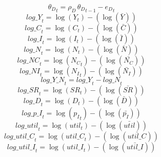 \begin{dmath}
{{\theta_D}}_{t}={{\rho_D}}\, {{\theta_D}}_{t-1}-{{e_D}}_{t}
\end{dmath}
\begin{dmath}
{log\_Y}_{t}=\log\left({{Y}}_{t}\right)-(\log\left(\bar{{Y}}\right))
\end{dmath}
\begin{dmath}
{log\_C}_{t}=\log\left({{C}}_{t}\right)-(\log\left(\bar{{C}}\right))
\end{dmath}
\begin{dmath}
{log\_I}_{t}=\log\left({{I}}_{t}\right)-(\log\left(\bar{{I}}\right))
\end{dmath}
\begin{dmath}
{log\_N}_{t}=\log\left({{N}}_{t}\right)-(\log\left(\bar{{N}}\right))
\end{dmath}
\begin{dmath}
{log\_NC}_{t}=\log\left({{N_C}}_{t}\right)-(\log\left(\bar{{N_C}}\right))
\end{dmath}
\begin{dmath}
{log\_NI}_{t}=\log\left({{N_I}}_{t}\right)-(\log\left(\bar{{N_I}}\right))
\end{dmath}
\begin{dmath}
{log\_Y\_N}_{t}={log\_Y}_{t}-{log\_N}_{t}
\end{dmath}
\begin{dmath}
{log\_SR}_{t}=\log\left({{SR}}_{t}\right)-(\log\left(\bar{{SR}}\right))
\end{dmath}
\begin{dmath}
{log\_D}_{t}=\log\left({{D}}_{t}\right)-(\log\left(\bar{{D}}\right))
\end{dmath}
\begin{dmath}
{log\_p\_I}_{t}=\log\left({{p_I}}_{t}\right)-(\log\left(\bar{{p_I}}\right))
\end{dmath}
\begin{dmath}
{log\_util}_{t}=\log\left({util}_{t}\right)-(\log\left(\bar{util}\right))
\end{dmath}
\begin{dmath}
{log\_util\_C}_{t}=\log\left({util\_C}_{t}\right)-(\log\left(\bar{util\_C}\right))
\end{dmath}
\begin{dmath}
{log\_util\_I}_{t}=\log\left({util\_I}_{t}\right)-(\log\left(\bar{util\_I}\right))
\end{dmath}
